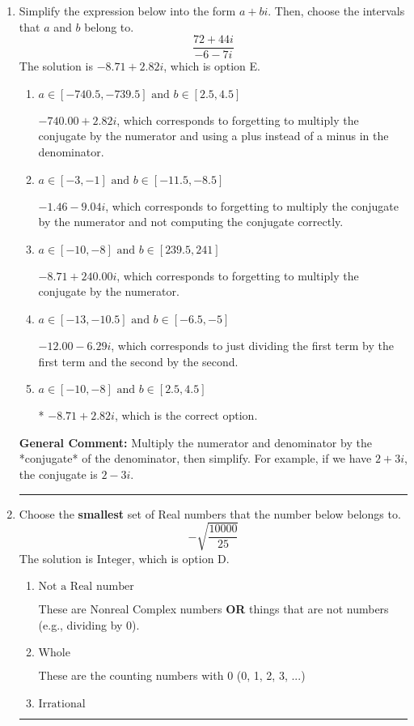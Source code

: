 \documentclass{extbook}[14pt]
\newcommand{\litem}[1]{\item #1

\rule{\textwidth}{0.4pt}}
\begin{document}
\begin{enumerate}\litem{
Simplify the expression below into the form $a+bi$. Then, choose the intervals that $a$ and $b$ belong to.
\[ \frac{72 + 44 i}{-6 - 7 i} \]The solution is \( -8.71  + 2.82 i \), which is option E.\begin{enumerate}[label=\Alph*.]
\item \( a \in [-740.5, -739.5] \text{ and } b \in [2.5, 4.5] \)

 $-740.00  + 2.82 i$, which corresponds to forgetting to multiply the conjugate by the numerator and using a plus instead of a minus in the denominator.
\item \( a \in [-3, -1] \text{ and } b \in [-11.5, -8.5] \)

 $-1.46  - 9.04 i$, which corresponds to forgetting to multiply the conjugate by the numerator and not computing the conjugate correctly.
\item \( a \in [-10, -8] \text{ and } b \in [239.5, 241] \)

 $-8.71  + 240.00 i$, which corresponds to forgetting to multiply the conjugate by the numerator.
\item \( a \in [-13, -10.5] \text{ and } b \in [-6.5, -5] \)

 $-12.00  - 6.29 i$, which corresponds to just dividing the first term by the first term and the second by the second.
\item \( a \in [-10, -8] \text{ and } b \in [2.5, 4.5] \)

* $-8.71  + 2.82 i$, which is the correct option.
\end{enumerate}

\textbf{General Comment:} Multiply the numerator and denominator by the *conjugate* of the denominator, then simplify. For example, if we have $2+3i$, the conjugate is $2-3i$.
}
\litem{
Choose the \textbf{smallest} set of Real numbers that the number below belongs to.
\[ -\sqrt{\frac{10000}{25}} \]The solution is \( \text{Integer} \), which is option D.\begin{enumerate}[label=\Alph*.]
\item \( \text{Not a Real number} \)

These are Nonreal Complex numbers \textbf{OR} things that are not numbers (e.g., dividing by 0).
\item \( \text{Whole} \)

These are the counting numbers with 0 (0, 1, 2, 3, ...)
\item \( \text{Irrational} \)


\end{enumerate}}
\end{enumerate}
\end{document}
